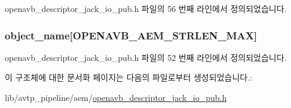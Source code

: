 openavb\+\_\+descriptor\+\_\+jack\+\_\+io\+\_\+pub.\+h 파일의 56 번째 라인에서 정의되었습니다.

\subsubsection[{\texorpdfstring{object\+\_\+name}{object_name}}]{ object\+\_\+name\mbox{[}{\bf O\+P\+E\+N\+A\+V\+B\+\_\+\+A\+E\+M\+\_\+\+S\+T\+R\+L\+E\+N\+\_\+\+M\+AX}\mbox{]}}\hypertarget{structopenavb__aem__descriptor__jack__io__t_a5e98aba8105a7a6d82fac41816c83da3}{}\label{structopenavb__aem__descriptor__jack__io__t_a5e98aba8105a7a6d82fac41816c83da3}


openavb\+\_\+descriptor\+\_\+jack\+\_\+io\+\_\+pub.\+h 파일의 52 번째 라인에서 정의되었습니다.



이 구조체에 대한 문서화 페이지는 다음의 파일로부터 생성되었습니다.\+:\begin{DoxyCompactItemize}
\item 
lib/avtp\+\_\+pipeline/aem/\hyperlink{openavb__descriptor__jack__io__pub_8h}{openavb\+\_\+descriptor\+\_\+jack\+\_\+io\+\_\+pub.\+h}\end{DoxyCompactItemize}
